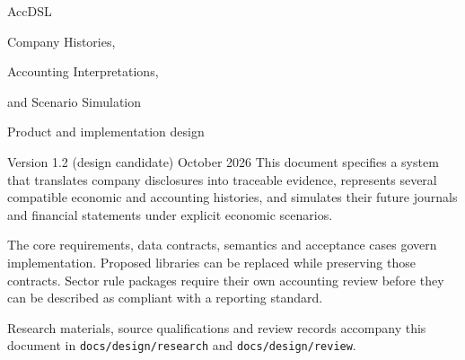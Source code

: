 \documentclass[11pt,a4paper]{report}
\newcommand{\code}[1]{\texttt{#1}}
\begin{document}
\hypersetup{pageanchor=false}
\begin{titlepage}
\vspace*{20mm}
{\sffamily\color{ink}\Huge AccDSL\par}
\vspace{7mm}
{\LARGE Company Histories,\par Accounting Interpretations,\par and Scenario Simulation\par}
\vspace{12mm}
{\Large Product and implementation design\par}
\vspace{5mm}
Version 1.2 (design candidate)  October 2026
\vfill
This document specifies a system that translates company disclosures into
traceable evidence, represents several compatible economic and accounting
histories, and simulates their future journals and financial statements under
explicit economic scenarios.

The core requirements, data contracts, semantics and acceptance cases govern
implementation. Proposed libraries can be replaced while preserving those
contracts. Sector rule packages require their own accounting review before
they can be described as compliant with a reporting standard.

\vspace{8mm}
Research materials, source qualifications and review records accompany this
document in \code{docs/design/research} and \code{docs/design/review}.
\end{titlepage}
\hypersetup{pageanchor=true}
\tableofcontents
\clearpage{}











\appendix



\begingroup\raggedright

\endgroup
\end{document}
